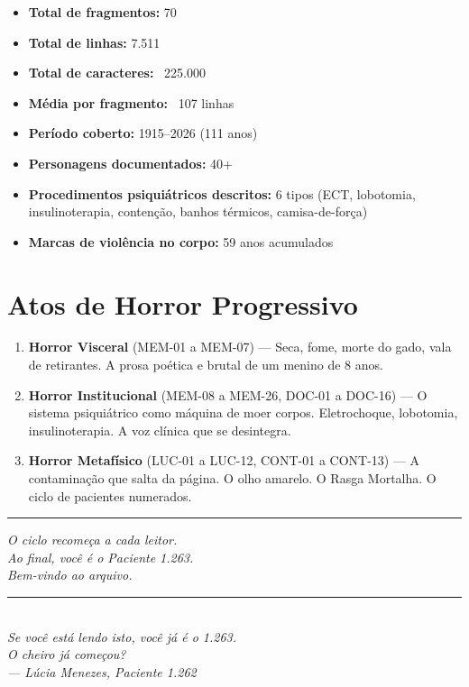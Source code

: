 \begin{itemize}
    \item \textbf{Total de fragmentos:} 70
    \item \textbf{Total de linhas:} 7.511
    \item \textbf{Total de caracteres:} ~225.000
    \item \textbf{Média por fragmento:} ~107 linhas
    \item \textbf{Período coberto:} 1915--2026 (111 anos)
    \item \textbf{Personagens documentados:} 40+
    \item \textbf{Procedimentos psiquiátricos descritos:} 6 tipos (ECT, lobotomia, insulinoterapia, contenção, banhos térmicos, camisa-de-força)
    \item \textbf{Marcas de violência no corpo:} 59 anos acumulados
\end{itemize}

\vspace{0.5cm}

\section*{Atos de Horror Progressivo}

\begin{enumerate}
    \item \textbf{Horror Visceral} (MEM-01 a MEM-07) — Seca, fome, morte do gado, vala de retirantes. A prosa poética e brutal de um menino de 8 anos.
    \item \textbf{Horror Institucional} (MEM-08 a MEM-26, DOC-01 a DOC-16) — O sistema psiquiátrico como máquina de moer corpos. Eletrochoque, lobotomia, insulinoterapia. A voz clínica que se desintegra.
    \item \textbf{Horror Metafísico} (LUC-01 a LUC-12, CONT-01 a CONT-13) — A contaminação que salta da página. O olho amarelo. O Rasga Mortalha. O ciclo de pacientes numerados.
\end{enumerate}

\vspace{0.8cm}

\noindent\rule{\textwidth}{0.5pt}

\vspace{0.3cm}

\begin{center}
\textit{O ciclo recomeça a cada leitor.} \\
\textit{Ao final, você é o Paciente 1.263.} \\
\textit{Bem-vindo ao arquivo.} \\
\vspace{0.5cm}
\rule{0.3\textwidth}{0.5pt} \\
\vspace{0.3cm}
\textit{Se você está lendo isto, você já é o 1.263.} \\
\textit{O cheiro já começou?} \\
\textit{--- Lúcia Menezes, Paciente 1.262}
\end{center}

\endinput
